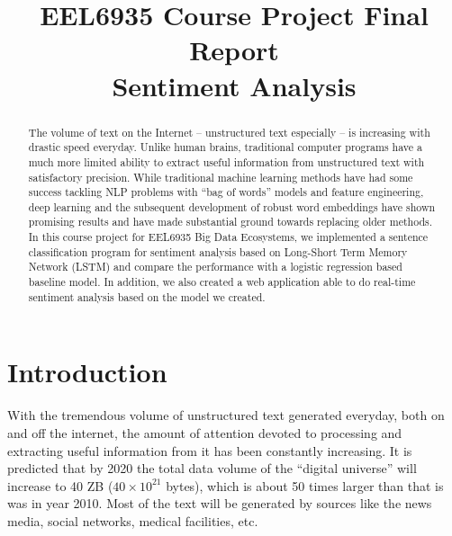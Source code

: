 \documentclass[conference]{IEEEtran}
\begin{document}
\renewcommand{\figureautorefname}{Fig.}
\newcommand{\subfigureautorefname}{Fig.}
\renewcommand{\sectionautorefname}{Section}
\renewcommand{\subsectionautorefname}{Section}


\title{EEL6935 Course Project Final Report \\
    Sentiment Analysis}
\author{
}

\maketitle

\begin{abstract}
    The volume of text on the Internet -- unstructured text especially --
    is increasing with drastic speed everyday. Unlike human brains, traditional
    computer programs have a much more limited ability to extract useful
    information from unstructured text with satisfactory precision.
    While traditional machine learning methods have had some success
    tackling NLP problems with ``bag of words'' models and feature engineering,
    deep learning and the subsequent development of robust word embeddings have shown
    promising results and have made substantial ground towards replacing older methods.
    In this course project for EEL6935 Big Data Ecosystems, we implemented a sentence
    classification program for sentiment analysis based on Long-Short Term Memory Network
    (LSTM) and compare the performance with a logistic regression based baseline model.
    In addition, we also created a web application able to do real-time sentiment analysis
    based on the model we created.

\end{abstract}

\IEEEpeerreviewmaketitle

\section{Introduction}
\label{intro}
    With the tremendous volume of unstructured text generated everyday, both on and off
    the internet, the amount of attention devoted to processing and extracting useful information
    from it has been constantly increasing. It is predicted that by 2020 the
    total data volume of the ``digital universe'' will increase to 40 ZB
    ($40\times 10^{21}$ bytes), which is about 50 times larger than that is was in
    year 2010\cite{gantz2012digital}. Most of the text will be generated by
    sources like the news media, social networks, medical facilities, etc.
\end{document}
